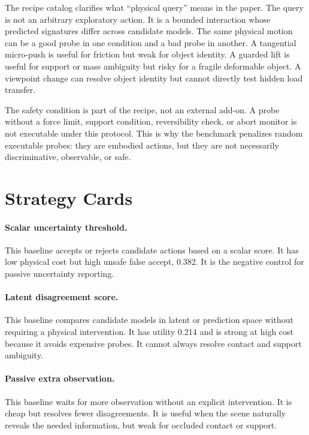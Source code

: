 \documentclass{article}
\begin{document}
The recipe catalog clarifies what ``physical query'' means in the paper. The query is not an arbitrary exploratory action. It is a bounded interaction whose predicted signatures differ across candidate models. The same physical motion can be a good probe in one condition and a bad probe in another. A tangential micro-push is useful for friction but weak for object identity. A guarded lift is useful for support or mass ambiguity but risky for a fragile deformable object. A viewpoint change can resolve object identity but cannot directly test hidden load transfer.

The safety condition is part of the recipe, not an external add-on. A probe without a force limit, support condition, reversibility check, or abort monitor is not executable under this protocol. This is why the benchmark penalizes random executable probes: they are embodied actions, but they are not necessarily discriminative, observable, or safe.

\section{Strategy Cards}

\paragraph{Scalar uncertainty threshold.}
This baseline accepts or rejects candidate actions based on a scalar score. It has low physical cost but high unsafe false accept, 0.382. It is the negative control for passive uncertainty reporting.

\paragraph{Latent disagreement score.}
This baseline compares candidate models in latent or prediction space without requiring a physical intervention. It has utility 0.214 and is strong at high cost because it avoids expensive probes. It cannot always resolve contact and support ambiguity.

\paragraph{Passive extra observation.}
This baseline waits for more observation without an explicit intervention. It is cheap but resolves fewer disagreements. It is useful when the scene naturally reveals the needed information, but weak for occluded contact or support.
\end{document}
